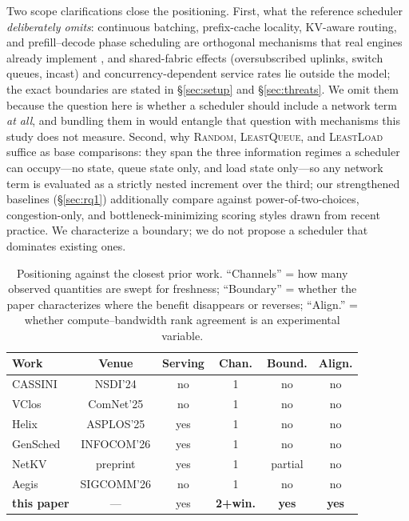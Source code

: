 Two scope clarifications close the positioning. First, what the reference scheduler
\emph{deliberately omits}: continuous batching, prefix-cache locality, KV-aware routing, and
prefill--decode phase scheduling are orthogonal mechanisms that real engines already implement
\cite{vllm,orca,alpaserve}, and shared-fabric effects (oversubscribed uplinks, switch queues,
incast) and concurrency-dependent service rates lie outside the model; the exact boundaries are
stated in \S\ref{sec:setup} and \S\ref{sec:threats}. We omit them because the question here is
whether a scheduler should include a network term \emph{at all}, and bundling them in would
entangle that question with mechanisms this study does not measure. Second, why
\textsc{Random}, \textsc{LeastQueue}, and \textsc{LeastLoad} suffice as base comparisons: they
span the three information regimes a scheduler can occupy---no state, queue state only, and
load state only---so any network term is evaluated as a strictly nested increment over the
third; our strengthened baselines (\S\ref{sec:rq1}) additionally compare against
power-of-two-choices, congestion-only, and bottleneck-minimizing scoring styles drawn from
recent practice. We characterize a boundary; we do not propose a scheduler that dominates
existing ones.

\begin{table}[t]
\centering
\caption{Positioning against the closest prior work. ``Channels'' = how many observed quantities
are swept for freshness; ``Boundary'' = whether the paper characterizes where the benefit
disappears or reverses; ``Align.'' = whether compute--bandwidth rank agreement is an experimental
variable.}
\label{tab:positioning}
\footnotesize
\setlength{\tabcolsep}{4pt}
\begin{tabular}{@{}lccccc@{}}
\toprule
Work & Venue & Serving & Chan. & Bound. & Align. \\
\midrule
CASSINI \cite{cassini}          & NSDI'24     & no  & 1 & no     & no \\
VClos \cite{vclos}              & ComNet'25   & no & 1 & no  & no \\
Helix \cite{helix}              & ASPLOS'25   & yes & 1 & no     & no \\
GenSched \cite{gensched}        & INFOCOM'26  & yes & 1 & no     & no \\
NetKV \cite{netkv}              & preprint    & yes & 1 & partial & no \\
Aegis \cite{aegis}              & SIGCOMM'26  & no  & 1 & no     & no \\
\textbf{this paper}             & ---         & yes & \textbf{2+win.} & \textbf{yes} & \textbf{yes} \\
\bottomrule
\end{tabular}
\end{table}
